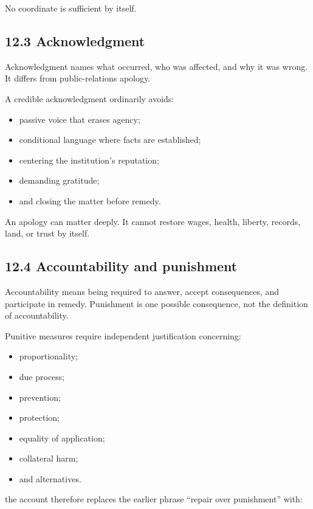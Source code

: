 \documentclass[
  11pt,
]{article}
\providecommand{\tightlist}{%
  \setlength{\itemsep}{0pt}\setlength{\parskip}{0pt}}
\begin{document}
No coordinate is sufficient by itself.

\subsection{12.3 Acknowledgment}\label{acknowledgment}

Acknowledgment names what occurred, who was affected, and why it was
wrong. It differs from public-relations apology.

A credible acknowledgment ordinarily avoids:

\begin{itemize}
\tightlist
\item
  passive voice that erases agency;
\item
  conditional language where facts are established;
\item
  centering the institution's reputation;
\item
  demanding gratitude;
\item
  and closing the matter before remedy.
\end{itemize}

An apology can matter deeply. It cannot restore wages, health, liberty,
records, land, or trust by itself.

\subsection{12.4 Accountability and
punishment}\label{accountability-and-punishment}

Accountability means being required to answer, accept consequences, and
participate in remedy. Punishment is one possible consequence, not the
definition of accountability.

Punitive measures require independent justification concerning:

\begin{itemize}
\tightlist
\item
  proportionality;
\item
  due process;
\item
  prevention;
\item
  protection;
\item
  equality of application;
\item
  collateral harm;
\item
  and alternatives.
\end{itemize}

the account therefore replaces the earlier phrase ``repair over
punishment'' with:
\end{document}
